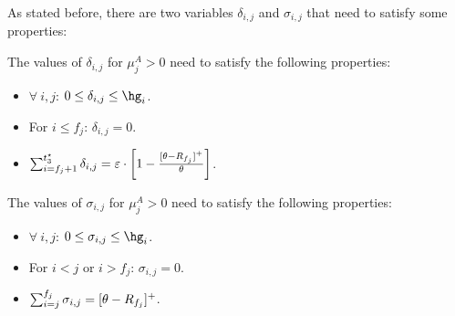 As stated before, there are two variables $\delta_{i,j}$ and $\sigma_{i,j}$ that need to satisfy some properties:

\begin{property}\label{property:delta}
    The values of $\delta_{i,j}$ for $\mu_j^A>0$ need to satisfy the following properties:
    \begin{itemize}
        \item $\forall \ i, j$: $0 \le \delta_{i,j} \le \hg_i$.
        \item For $i\leq f_j$: $\delta_{i,j}=0$.
        \item $\sum_{i=f_j+1}^{t_3^\star} \delta_{i,j} = \varepsilon \cdot \left[1 -\frac{[\theta-R_{f_j}]^+}{\theta}\right]$.
    \end{itemize}
\end{property}

\begin{property}\label{property:sigma}
    The values of $\sigma_{i,j}$ for $\mu_j^A>0$ need to satisfy the following properties:
    \begin{itemize}
        \item $\forall \ i, j$: $0 \le \sigma_{i,j} \le \hg_i$.
        \item For $i < j$ or $i > f_j$: $\sigma_{i,j}=0$.
        \item $\sum_{i=j}^{f_j} \sigma_{i,j} = [\theta-R_{f_j}]^+$.
    \end{itemize}
\end{property}
